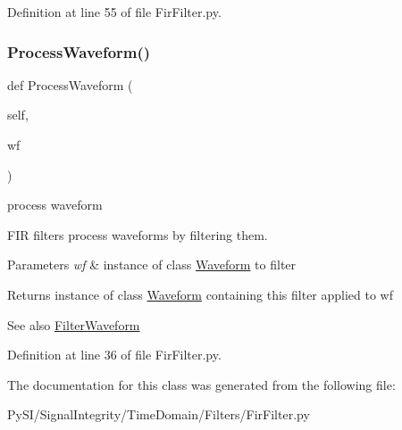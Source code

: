 Definition at line 55 of file Fir\+Filter.\+py.

\mbox{\label{classSignalIntegrity_1_1TimeDomain_1_1Filters_1_1FirFilter_1_1FirFilter_ae09bec195c9cb1d5819e73b7be169b11}} 
\subsubsection{\texorpdfstring{Process\+Waveform()}{ProcessWaveform()}}
{\footnotesize\ttfamily def Process\+Waveform (\begin{DoxyParamCaption}\item[{}]{self,  }\item[{}]{wf }\end{DoxyParamCaption})}



process waveform 

F\+IR filters process waveforms by filtering them.


\begin{DoxyParams}{Parameters}
{\em wf} & instance of class \hyperlink{namespaceSignalIntegrity_1_1TimeDomain_1_1Waveform}{Waveform} to filter \\
\hline
\end{DoxyParams}
\begin{DoxyReturn}{Returns}
instance of class \hyperlink{namespaceSignalIntegrity_1_1TimeDomain_1_1Waveform}{Waveform} containing this filter applied to wf 
\end{DoxyReturn}
\begin{DoxySeeAlso}{See also}
\hyperlink{classSignalIntegrity_1_1TimeDomain_1_1Filters_1_1FirFilter_1_1FirFilter_a84e73c18250ca4a61482f94ad61e735b}{Filter\+Waveform} 
\end{DoxySeeAlso}


Definition at line 36 of file Fir\+Filter.\+py.



The documentation for this class was generated from the following file\+:\begin{DoxyCompactItemize}
\item 
Py\+S\+I/\+Signal\+Integrity/\+Time\+Domain/\+Filters/Fir\+Filter.\+py\end{DoxyCompactItemize}
